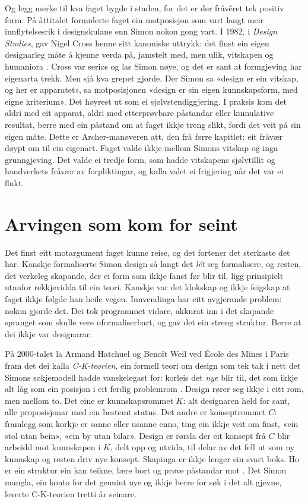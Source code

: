 Og legg merke til kva faget bygde i staden, for det er der fråvêret tek positiv form. På åttitalet formulerte faget ein motposisjon som vart langt meir innflytelsesrik i designskulane enn Simon nokon gong vart. I 1982, i \textit{Design Studies}, gav Nigel Cross henne sitt kanoniske uttrykk: det finst ein eigen designarleg måte å kjenne verda på, jamstelt med, men ulik, vitskapen og humaniora \autocite{cross1982}. Cross var seriøs og las Simon nøye, og det er sant at formgjeving har eigenarta trekk. Men sjå kva grepet gjorde. Der Simon sa «design er ein vitskap, og her er apparatet», sa motposisjonen «design er sin eigen kunnskapsform, med eigne kriterium». Det høyrest ut som ei sjølvstendiggjering. I praksis kom det aldri med eit apparat, aldri med etterprøvbare påstandar eller kumulative resultat, berre med ein påstand om at faget ikkje treng slikt, fordi det veit på sin eigen måte. Dette er Archer-manøveren att, den frå førre kapitlet: eit fråvær døypt om til ein eigenart. Faget valde ikkje mellom Simons vitskap og inga grunngjeving. Det valde ei tredje form, som hadde vitskapens sjølvtillit og handverkets fråvær av forpliktingar, og kalla valet ei frigjering når det var ei flukt.

\section{Arvingen som kom for seint}

Det finst eitt motargument faget kunne reise, og det fortener det sterkaste det har. Kanskje formaliserte Simon design så langt det \emph{lét} seg formalisere, og resten, det verkeleg skapande, der ei form som ikkje fanst før blir til, ligg prinsipielt utanfor rekkjevidda til ein teori. Kanskje var det klokskap og ikkje feigskap at faget ikkje følgde han heile vegen. Innvendinga har eitt avgjerande problem: nokon gjorde det. Dei tok programmet vidare, akkurat inn i det skapande spranget som skulle vere uformaliserbart, og gav det ein streng struktur. Berre at dei ikkje var designarar.

På 2000-talet la Armand Hatchuel og Benoît Weil ved École des Mines i Paris fram det dei kalla \emph{C-K-teorien}, ein formell teori om design som tek tak i nett det Simons søkjemodell hadde vanskelegast for: korleis det \emph{nye} blir til, det som ikkje alt låg som ein posisjon i eit ferdig problemrom \autocite{hatchuel2003}. Design rører seg ikkje i eitt rom, men mellom to. Det eine er kunnskapsrommet $K$: alt designaren held for sant, alle proposisjonar med ein bestemt status. Det andre er konseptrommet $C$: framlegg som korkje er sanne eller usanne enno, ting ein ikkje veit om finst, «ein stol utan bein», «ein by utan bilar». Design er rørsla der eit konsept frå $C$ blir arbeidd mot kunnskapen i $K$, delt opp og utvida, til delar av det fell ut som ny kunnskap og resten driv nye konsept. Skapinga er ikkje lenger ein svart boks. Ho er ein struktur ein kan teikne, lære bort og prøve påstandar mot \autocite{hatchuel2009}. Det Simon mangla, ein konto for det genuint nye og ikkje berre for søk i det alt gjevne, leverte C-K-teorien tretti år seinare.

